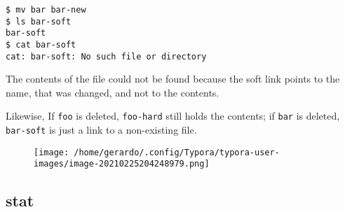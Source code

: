 \documentclass[]{article}
\begin{document}
\begin{itemize}
\begin{verbatim}
$ mv bar bar-new
$ ls bar-soft
bar-soft
$ cat bar-soft  
cat: bar-soft: No such file or directory
\end{verbatim}

  The contents of the file could not be found because the soft link
  points to the name, that was changed, and not to the contents.

  Likewise, If \texttt{foo} is deleted, \texttt{foo-hard} still holds
  the contents; if \texttt{bar} is deleted, \texttt{bar-soft} is just a
  link to a non-existing file.

  \begin{figure}
  \centering
  \texttt{[image: /home/gerardo/.config/Typora/typora-user-images/image-20210225204248979.png]}
  \caption{}
  \end{figure}
\end{itemize}

\subsection{\texorpdfstring{\textbf{stat}}{stat}}\label{header-n287}
\end{document}
